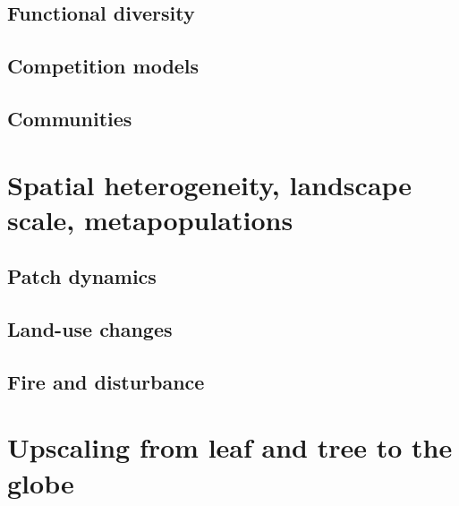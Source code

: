 \documentclass[
  oneside]{book}
\begin{document}

\hypertarget{functional-diversity}{%
\section{Functional diversity}\label{functional-diversity}}

\hypertarget{competition-models}{%
\section{Competition models}\label{competition-models}}

\hypertarget{communities}{%
\section{Communities}\label{communities}}

\hypertarget{spatial-heterogeneity-landscape-scale-metapopulations}{%
\chapter{Spatial heterogeneity, landscape scale, metapopulations}\label{spatial-heterogeneity-landscape-scale-metapopulations}}


\hypertarget{patch-dynamics}{%
\section{Patch dynamics}\label{patch-dynamics}}

\hypertarget{land-use-changes}{%
\section{Land-use changes}\label{land-use-changes}}

\hypertarget{fire-and-disturbance}{%
\section{Fire and disturbance}\label{fire-and-disturbance}}

\hypertarget{upscaling-from-leaf-and-tree-to-the-globe}{%
\chapter{Upscaling from leaf and tree to the globe}\label{upscaling-from-leaf-and-tree-to-the-globe}}
\end{document}
